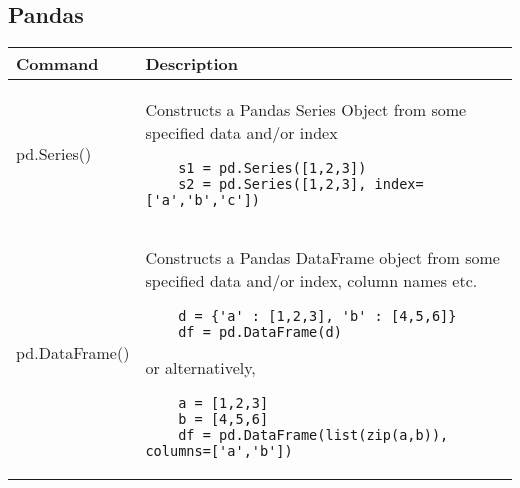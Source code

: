 \documentclass[]{article}
\begin{document}
    \subsection{Pandas}
    \begin{longtable}{| m{6cm}  | m{11cm} |}
    \hline
    \textbf{Command} & \textbf{Description} 
    \\\hline
    pd.Series() & Constructs a Pandas Series Object from some specified data and/or index
    \begin{verbatim}
    s1 = pd.Series([1,2,3])
    s2 = pd.Series([1,2,3], index=['a','b','c'])
    \end{verbatim}
    \\\hline
    pd.DataFrame() & Constructs a Pandas DataFrame object from some specified data and/or index, column names etc.
    \begin{verbatim}
    d = {'a' : [1,2,3], 'b' : [4,5,6]}
    df = pd.DataFrame(d)
    \end{verbatim}
    or alternatively,
    \begin{verbatim}
    a = [1,2,3]
    b = [4,5,6]
    df = pd.DataFrame(list(zip(a,b)), columns=['a','b'])
    \end{verbatim}
    \\\hline
    \end{longtable}
\end{document}
